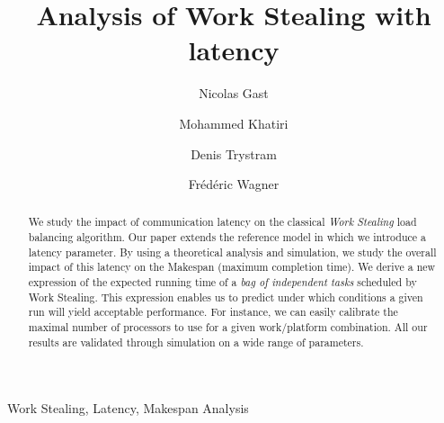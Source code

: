 \documentclass[a4paper,fleqn]{cas-sc}
\begin{document}
\let\WriteBookmarks\relax
\def\floatpagepagefraction{1}
\def\textpagefraction{.001}

\title [mode = title]{Analysis of Work Stealing with latency}                      


\author[1]{Nicolas Gast}
\author[1,2]{Mohammed Khatiri}
\author[1]{Denis Trystram}
\author[1]{Fr\'ed\'eric Wagner}

                                                
\address[1]{Univ. Grenoble Alpes, Inria, CNRS, Grenoble INP, LIG, 38000 Grenoble, France}
\address[2]{University Mohammed First, Faculty of Sciences, LaRI, 60000, Oujda, Morocco}
\address[]{Email: firstname.lastname@inria.fr} 




\begin{abstract}
 We study the impact of communication latency on the
  classical \emph{Work Stealing} load balancing algorithm.  Our paper
  extends the reference model in which we introduce a latency
  parameter. By using a theoretical analysis and simulation, we study
  the overall impact of this latency on the Makespan (maximum
  completion time). We derive a new expression of the expected
  running time of a \textit{bag of independent tasks} scheduled by Work Stealing.
  This expression enables us to predict under which conditions a given run
  will yield acceptable performance. For instance, we can easily
  calibrate the maximal number of processors to use for a given
  work/platform combination.  All our results are validated through
  simulation on a wide range of parameters.
\end{abstract}


%

\begin{keywords}
Work Stealing, Latency, Makespan Analysis
\end{keywords}
\end{document}
